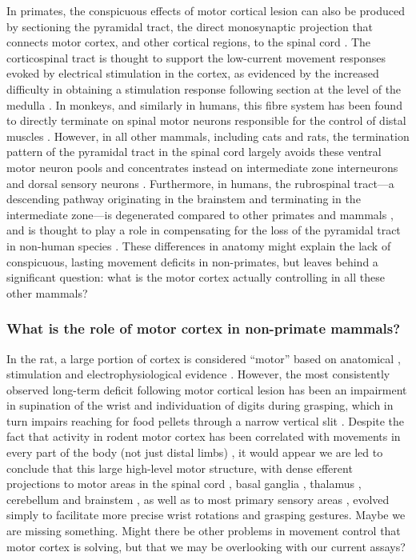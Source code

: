 In primates, the conspicuous effects of motor cortical lesion can also be produced by sectioning the pyramidal tract, the direct monosynaptic projection that connects motor cortex, and other cortical regions, to the spinal cord \cite{Tower1940,Lawrence1968}. The corticospinal tract is thought to support the low-current movement responses evoked by electrical stimulation in the cortex, as evidenced by the increased difficulty in obtaining a stimulation response following section at the level of the medulla \cite{Woolsey1972}. In monkeys, and similarly in humans, this fibre system has been found to directly terminate on spinal motor neurons responsible for the control of distal muscles \cite{Leyton1917,Bernhard1954}. However, in all other mammals, including cats and rats, the termination pattern of the pyramidal tract in the spinal cord largely avoids these ventral motor neuron pools and concentrates instead on intermediate zone interneurons and dorsal sensory neurons \cite{Kuypers1981,Yang2003}. Furthermore, in humans, the rubrospinal tract---a descending pathway originating in the brainstem and terminating in the intermediate zone---is degenerated compared to other primates and mammals \cite{Nathan1955,Nathan1982}, and is thought to play a role in compensating for the loss of the pyramidal tract in non-human species \cite{Lawrence1968a,Zaaimi2012}. These differences in anatomy might explain the lack of conspicuous, lasting movement deficits in non-primates, but leaves behind a significant question: what is the motor cortex actually controlling in all these other mammals?

\subsubsection*{What is the role of motor cortex in non-primate mammals?}

In the rat, a large portion of cortex is considered ``motor'' based on anatomical \cite{Donoghue1982}, stimulation \cite{Donoghue1982,Neafsey1986} and electrophysiological evidence \cite{Hyland1998}. However, the most consistently observed long-term deficit following motor cortical lesion has been an impairment in supination of the wrist and individuation of digits during grasping, which in turn impairs reaching for food pellets through a narrow vertical slit \cite{Whishaw1991,Alaverdashvili2008a}. Despite the fact that activity in rodent motor cortex has been correlated with movements in every part of the body (not just distal limbs) \cite{Hill2011,Erlich2011}, it would appear we are led to conclude that this large high-level motor structure, with dense efferent projections to motor areas in the spinal cord \cite{Kuypers1981}, basal ganglia \cite{Turner2000,Wu2009}, thalamus \cite{Lee2008}, cerebellum \cite{Baker2001} and brainstem \cite{Jarratt1999}, as well as to most primary sensory areas \cite{Petreanu2012,Schneider2014}, evolved simply to facilitate more precise wrist rotations and grasping gestures. Maybe we are missing something. Might there be other problems in movement control that motor cortex is solving, but that we may be overlooking with our current assays?


